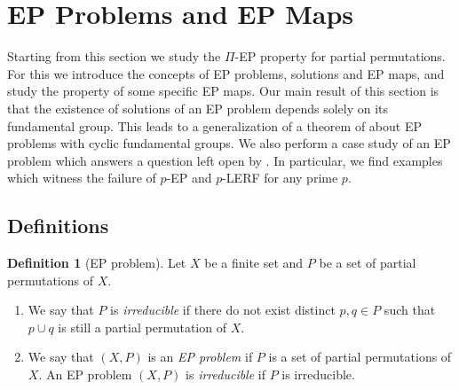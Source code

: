 \documentclass[10pt,a4paper]{amsart}
\theoremstyle{definition}
\newtheorem{definition}[theorem]{Definition}
\theoremstyle{definition}
\numberwithin{equation}{section}
\begin{document}




























































\section{EP Problems and EP Maps}

Starting from this section we study the $\Pi$-EP property for partial permutations. For this we introduce the concepts of EP problems, solutions and EP maps,  and study the property of some specific EP maps. Our main result of this section is that the existence of solutions of an EP problem depends solely on its fundamental group. This leads to a generalization of a theorem of \cite{HPSW19} about EP problems with cyclic fundamental groups. We also perform a case study of an EP problem which answers a question left open by \cite{HPSW19}. In particular, we find examples which witness the failure of $p$-EP and $p$-LERF for any prime $p$.

\subsection{Definitions\label{subsec:EPproblem}}

\begin{definition}[EP problem]\label{def:EPproblem} Let $X$ be a finite set and $P$ be a set of partial permutations of $X$.
\begin{enumerate}
\item[(1)] We say that $P$ is {\em irreducible} if there do not exist distinct $p, q\in P$ such that $p\cup q$ is still a partial permutation of $X$.
\item[(2)] We say that $(X, P)$ is an {\em EP problem} if $P$ is a set of partial permutations of $X$. An EP problem $(X, P)$ is {\em irreducible} if $P$ is irreducible.
\end{enumerate}
\end{definition}
\end{document}
